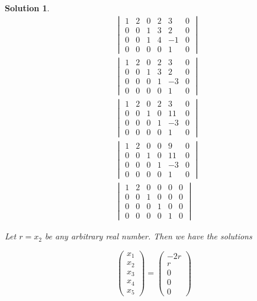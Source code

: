 \documentclass{article}
\newtheorem*{solution}{Solution}
\begin{document}
\begin{solution}

\begin{align*}
&\begin{vmatrix}
1 & 2 & 0 & 2 & 3 & 0 \\
0 & 0 & 1 & 3 & 2 & 0 \\
0 & 0 & 1 & 4 & -1 & 0 \\
0 & 0 & 0 & 0 & 1 & 0
\end{vmatrix} \\
&\begin{vmatrix}
1 & 2 & 0 & 2 & 3 & 0 \\
0 & 0 & 1 & 3 & 2 & 0 \\
0 & 0 & 0 & 1 & -3 & 0 \\
0 & 0 & 0 & 0 & 1 & 0
\end{vmatrix} \\
&\begin{vmatrix}
1 & 2 & 0 & 2 & 3 & 0 \\
0 & 0 & 1 & 0 & 11 & 0 \\
0 & 0 & 0 & 1 & -3 & 0 \\
0 & 0 & 0 & 0 & 1 & 0
\end{vmatrix} \\
&\begin{vmatrix} 
1 & 2 & 0 & 0 & 9 & 0 \\
0 & 0 & 1 & 0 & 11 & 0 \\
0 & 0 & 0 & 1 & -3 & 0 \\
0 & 0 & 0 & 0 & 1 & 0
\end{vmatrix} \\
&\begin{vmatrix}
1 & 2 & 0 & 0 & 0 & 0 \\
0 & 0 & 1 & 0 & 0 & 0 \\
0 & 0 & 0 & 1 & 0 & 0 \\
0 & 0 & 0 & 0 & 1 & 0
\end{vmatrix}
\end{align*}

Let $r = x_{2}$ be any arbitrary real number. Then we have the solutions

\begin{equation*}
\begin{pmatrix}
x_{1} \\ x_{2} \\ x_{3} \\ x_{4} \\ x_{5}
\end{pmatrix}
=
\begin{pmatrix}
-2r \\ r \\ 0 \\ 0 \\ 0
\end{pmatrix}
\end{equation*}

\end{solution}
\end{document}
